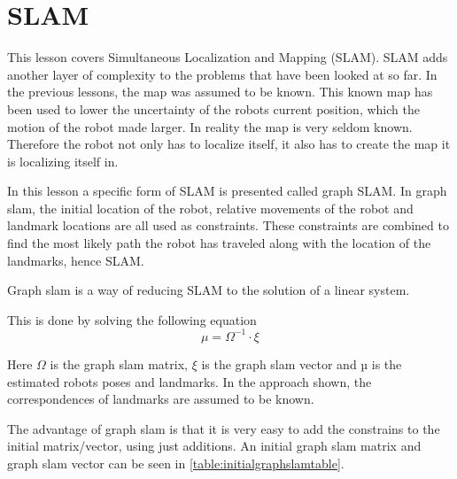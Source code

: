 \documentclass[Main]{subfiles}
\begin{document}
\section{SLAM} %
	\label{sec:slam}
	This lesson covers Simultaneous Localization and Mapping (SLAM). 
	SLAM adds another layer of complexity to the problems that have been looked at so far. 
	In the previous lessons, the map was assumed to be known. 
	This known map has been used to lower the uncertainty of the robots current position, which the motion of the robot made larger.
	In reality the map is very seldom known.
	Therefore the robot not only has to localize itself, it also has to create the map it is localizing itself in.
	
	In this lesson a specific form of SLAM is presented called graph SLAM.
	In graph slam, the initial location of the robot, relative movements of the robot and landmark locations are all used as constraints. 
	These constraints are combined to find the most likely path the robot has traveled along with the location of the landmarks, hence SLAM.
	
	Graph slam is a way of reducing SLAM to the solution of a linear system. 
	
	This is done by solving the following equation
	\begin{equation}
		\mu = \Omega^{-1} \cdot \xi
	\end{equation}
	
	Here $\Omega$ is the graph slam matrix, $\xi$ is the graph slam vector and µ is the estimated robots poses and landmarks. 
	In the approach shown, the correspondences of landmarks are assumed to be known.

	The advantage of graph slam is that it is very easy to add the constrains to the initial matrix/vector, using just additions.
	An initial graph slam matrix and graph slam vector can be seen in \autoref{table:initialgraphslamtable}. 
\end{document}
